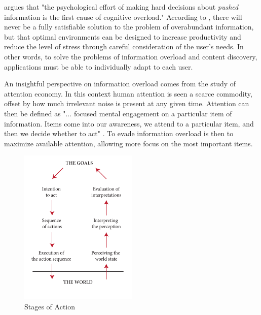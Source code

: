 \cite{Kirsh2000} argues that "the psychological effort of making hard decisions about \emph{pushed} information is the first cause of cognitive overload." 
According to \citeauthor{Kirsh2000}, there will never be a fully satisfiable solution to the problem of overabundant information, 
but that optimal environments can be designed to increase productivity and reduce the level of stress through careful consideration of the user's needs. 
In other words, to solve the problems of information overload and content discovery, applications must be able to individually adapt to each user. 

An insightful perspective on information overload comes from the study of attention economy. 
In this context human attention is seen a scarce commodity, offset by how much irrelevant noise is present at any given time. 
Attention can then be defined as "... focused mental engagement on a particular item of information. 
Items come into our awareness, we attend to a particular item, and then we decide whether to act" \cite[p1]{Davenport2001}. 
To evade information overload is then to maximize available attention, allowing more focus on the most important items.

\begin{figure}
  \vspace{-20pt}
  \begin{center}
    \includegraphics[width=0.5\textwidth]{../graphics/seven-stages.pdf}
    \vspace{-20pt}
    \caption[The Seven Stages of Action]{Stages of Action}
  \end{center}
  \label{fig:seven-stages}
  \vspace{-20pt}
\end{figure}

